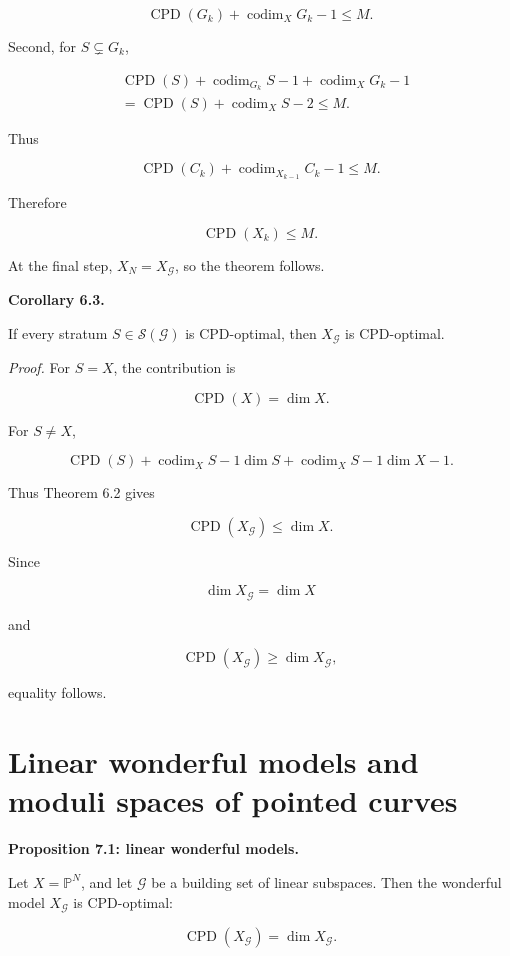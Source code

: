 \documentclass[11pt]{amsart}
\theoremstyle{definition}
\begin{document}
\[
\operatorname{CPD}(G_k)+\operatorname{codim}_XG_k-1\le M.
\]

Second, for $S\subsetneq G_k$,

\[
\begin{aligned}
&
\operatorname{CPD}(S)
+\operatorname{codim}_{G_k}S-1
+\operatorname{codim}_XG_k-1
\\
&=
\operatorname{CPD}(S)+\operatorname{codim}_XS-2
\le M.
\end{aligned}
\]

Thus

\[
\operatorname{CPD}(C_k)+
\operatorname{codim}_{X_{k-1}}C_k-1
\le M.
\]

Therefore

\[
\operatorname{CPD}(X_k)\le M.
\]

At the final step, $X_N=X_{\mathcal G}$, so the theorem follows.

\noindent\textbf{Corollary 6.3.}

If every stratum $S\in\mathcal S(\mathcal G)$ is CPD-optimal, then $X_{\mathcal G}$ is CPD-optimal.

\noindent\emph{Proof.} For $S=X$, the contribution is

\[
\operatorname{CPD}(X)=\dim X.
\]

For $S\ne X$,

\[
\operatorname{CPD}(S)+\operatorname{codim}_XS-1
\dim S+\operatorname{codim}_XS-1
\dim X-1.
\]

Thus Theorem 6.2 gives

\[
\operatorname{CPD}(X_{\mathcal G})\le \dim X.
\]

Since

\[
\dim X_{\mathcal G}=\dim X
\]

and

\[
\operatorname{CPD}(X_{\mathcal G})\ge\dim X_{\mathcal G},
\]

equality follows.

\section{Linear wonderful models and moduli spaces of pointed curves}

\noindent\textbf{Proposition 7.1: linear wonderful models.}

Let $X=\mathbb P^N$, and let $\mathcal G$ be a building set of linear subspaces. Then the wonderful model $X_{\mathcal G}$ is CPD-optimal:

\[
\operatorname{CPD}(X_{\mathcal G})=\dim X_{\mathcal G}.
\]
\end{document}
